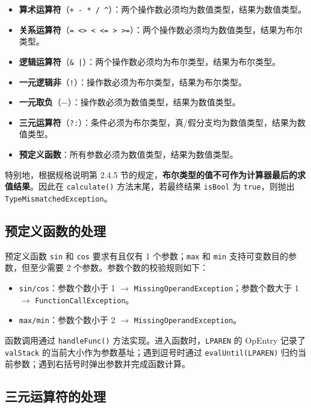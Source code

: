 \begin{itemize}
    \item \textbf{算术运算符}（\texttt{+ - * / \^{}}）：两个操作数必须均为数值类型，结果为数值类型。
    \item \textbf{关系运算符}（\texttt{= <> < <= > >=}）：两个操作数必须均为数值类型，结果为布尔类型。
    \item \textbf{逻辑运算符}（\texttt{\& |}）：两个操作数必须均为布尔类型，结果为布尔类型。
    \item \textbf{一元逻辑非}（\texttt{!}）：操作数必须为布尔类型，结果为布尔类型。
    \item \textbf{一元取负}（$-$）：操作数必须为数值类型，结果为数值类型。
    \item \textbf{三元运算符}（\texttt{?:}）：条件必须为布尔类型，真/假分支均为数值类型，结果为数值类型。
    \item \textbf{预定义函数}：所有参数必须为数值类型，结果为数值类型。
\end{itemize}

特别地，根据规格说明第 2.4.5 节的规定，\textbf{布尔类型的值不可作为计算器最后的求值结果}。因此在 \texttt{calculate()} 方法末尾，若最终结果 \texttt{isBool} 为 \texttt{true}，则抛出 \texttt{TypeMismatchedException}。

\subsection{预定义函数的处理}

预定义函数 \texttt{sin} 和 \texttt{cos} 要求有且仅有 1 个参数；\texttt{max} 和 \texttt{min} 支持可变数目的参数，但至少需要 2 个参数。参数个数的校验规则如下：

\begin{itemize}
    \item \texttt{sin/cos}：参数个数小于 1 $\rightarrow$ \texttt{MissingOperandException}；参数个数大于 1 $\rightarrow$ \texttt{FunctionCallException}。
    \item \texttt{max/min}：参数个数小于 2 $\rightarrow$ \texttt{MissingOperandException}。
\end{itemize}

函数调用通过 \texttt{handleFunc()} 方法实现。进入函数时，\texttt{LPAREN} 的 OpEntry 记录了 \texttt{valStack} 的当前大小作为参数基址；遇到逗号时通过 \texttt{evalUntil(LPAREN)} 归约当前参数；遇到右括号时弹出参数并完成函数计算。

\subsection{三元运算符的处理}

